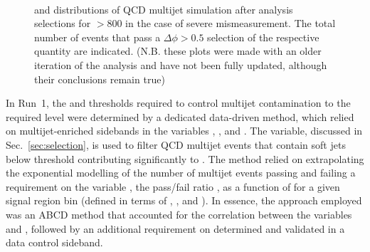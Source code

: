 \begin{figure}[!h]
 \centering
  \\
 \caption{\bdphi and \dphimhtj distributions of QCD multijet simulation
 after analysis selections for \scalht $> 800$ \GeV in the case of
 severe mismeasurement. The
 total number of events that pass a $\Delta\phi > 0.5$ selection of the
 respective quantity are indicated. (N.B. these plots were made with
 an older iteration of the analysis and have not been fully updated,
 although their conclusions remain true)}
 \label{fig:bDPhi_mismeasured}
\end{figure}


In Run~1, the \alphat and \bdphi thresholds required to control
multijet contamination to the required level were determined by a
dedicated data-driven method, which relied on multijet-enriched
sidebands in the variables \alphat, \bdphi, and \mhtmet. The \mhtmet
variable, discussed in Sec.~\ref{sec:selection}, is used to filter QCD
multijet events that contain soft jets below threshold contributing
significantly to \mht. The method relied on extrapolating the
exponential modelling of the number of multijet events passing and
failing a requirement on the variable \mhtmet, \ie the pass/fail ratio
\rmhtmet, as a function of \alphat for a given signal region bin
(defined in terms of \njet, \nb, and \scalht). In essence, the
approach employed was an ABCD method that accounted for the
correlation between the variables \rmhtmet and \alphat, followed
by an additional requirement on \bdphi determined and validated in a
data control sideband.

